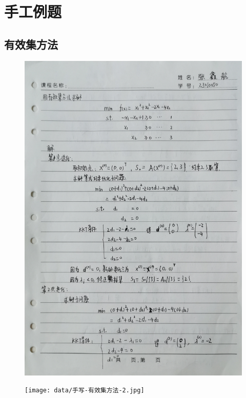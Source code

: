 \section{手工例题}
\subsection{有效集方法}
\begin{figure}[H]
    \centering
    \includegraphics[width = \textwidth]{data/手写-有效集方法-1.jpg}
\end{figure}
\begin{figure}[H]
    \centering
    \texttt{[image: data/手写-有效集方法-2.jpg]}
\end{figure}
